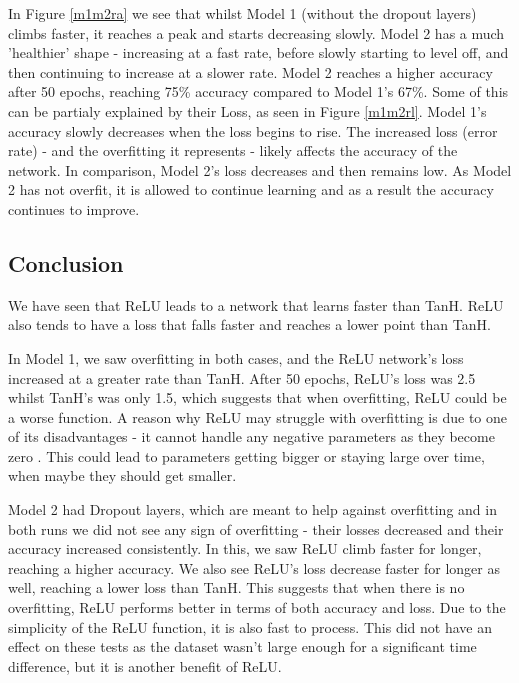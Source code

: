 \documentclass[a4paper, 11pt]{article}
\begin{document}
In Figure \ref{m1m2ra} we see that whilst Model 1 (without the dropout layers) climbs faster, it reaches a peak and starts decreasing slowly. Model 2 has a much 'healthier' shape - increasing at a fast rate, before slowly starting to level off, and then continuing to increase at a slower rate. Model 2 reaches a higher accuracy after 50 epochs, reaching 75\% accuracy compared to Model 1's 67\%. Some of this can be partialy explained by their Loss, as seen in Figure \ref{m1m2rl}. Model 1's accuracy slowly decreases when the loss begins to rise. The increased loss (error rate) - and the overfitting it represents - likely affects the accuracy of the network. In comparison, Model 2's loss decreases and then remains low. As Model 2 has not overfit, it is allowed to continue learning and as a result the accuracy continues to improve. 

\subsection*{Conclusion}

We have seen that ReLU leads to a network that learns faster than TanH. ReLU also tends to have a loss that falls faster and reaches a lower point than TanH.

In Model 1, we saw overfitting in both cases, and the ReLU network's loss increased at a greater rate than TanH. After 50 epochs, ReLU's loss was 2.5 whilst TanH's was only 1.5, which suggests that when overfitting, ReLU could be a worse function.
A reason why ReLU may struggle with overfitting is due to one of its disadvantages - it cannot handle any negative parameters as they become zero \cite{CNN Lecture}. This could lead to parameters getting bigger or staying large over time, when maybe they should get smaller.

Model 2 had Dropout layers, which are meant to help against overfitting and in both runs we did not see any sign of overfitting - their losses decreased and their accuracy increased consistently. In this, we saw ReLU climb faster for longer, reaching a higher accuracy. We also see ReLU's loss decrease faster for longer as well, reaching a lower loss than TanH. 
This suggests that when there is no overfitting, ReLU performs better in terms of both accuracy and loss. Due to the simplicity of the ReLU function, it is also fast to process. This did not have an effect on these tests as the dataset wasn't large enough for a significant time difference, but it is another benefit of ReLU. 
\end{document}
